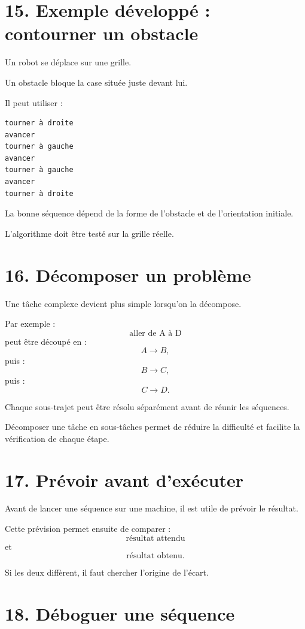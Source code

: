 \section{15. Exemple développé : contourner un obstacle}

Un robot se déplace sur une grille.

Un obstacle bloque la case située juste devant lui.

Il peut utiliser :
\begin{verbatim}
tourner à droite
avancer
tourner à gauche
avancer
tourner à gauche
avancer
tourner à droite
\end{verbatim}

La bonne séquence dépend de la forme de l'obstacle et de l'orientation initiale.

L'algorithme doit être testé sur la grille réelle.

\section{16. Décomposer un problème}

Une tâche complexe devient plus simple lorsqu'on la décompose.

Par exemple :
\[
\text{aller de A à D}
\]
peut être découpé en :
\[
A\longrightarrow B,
\]
puis :
\[
B\longrightarrow C,
\]
puis :
\[
C\longrightarrow D.
\]

Chaque sous-trajet peut être résolu séparément avant de réunir les séquences.

\begin{propriete}
Décomposer une tâche en sous-tâches permet de réduire la difficulté et facilite la vérification de chaque étape.
\end{propriete}

\section{17. Prévoir avant d'exécuter}

Avant de lancer une séquence sur une machine, il est utile de prévoir le résultat.

Cette prévision permet ensuite de comparer :
\[
\text{résultat attendu}
\]
et
\[
\text{résultat obtenu}.
\]

Si les deux diffèrent, il faut chercher l'origine de l'écart.

\section{18. Déboguer une séquence}

